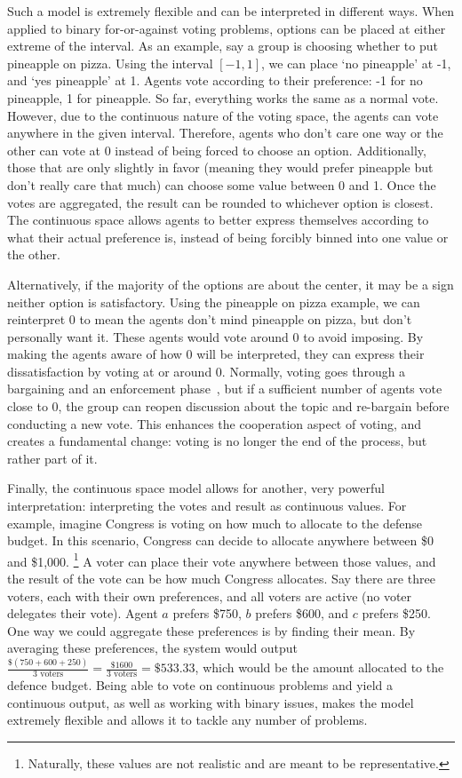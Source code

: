 Such a model is extremely flexible and can be interpreted in different ways.
When applied to binary for-or-against voting problems, options can be placed at either
extreme of the interval.
As an example, say a group is choosing whether to put pineapple on pizza.
Using the interval $[-1, 1]$, we can place `no pineapple' at -1, and `yes pineapple'
at 1.
Agents vote according to their preference: -1 for no pineapple, 1 for pineapple.
So far, everything works the same as a normal vote.
However, due to the continuous nature of the voting space, the agents can vote
anywhere in the given interval.
Therefore, agents who don't care one way or the other can vote at 0 instead of being
forced to choose an option.
Additionally, those that are only slightly in favor (meaning they would prefer
pineapple but don't really care that much) can choose some value between 0 and 1.
Once the votes are aggregated, the result can be rounded to whichever option is
closest.
The continuous space allows agents to better express themselves according to what
their actual preference is, instead of being forcibly binned into one value or the
other.

Alternatively, if the majority of the options are about the center, it may be a sign
neither option is satisfactory.
Using the pineapple on pizza example, we can reinterpret 0 to mean the agents don't
mind pineapple on pizza, but don't personally want it.
These agents would vote around 0 to avoid imposing.
By making the agents aware of how 0 will be interpreted, they can express their
dissatisfaction by voting at or around 0.
Normally, voting goes through a bargaining and an enforcement
phase~\cite{Fearon1998}, but if a sufficient number of agents vote close to 0, the
group can reopen discussion about the topic and re-bargain before conducting a new vote.
This enhances the cooperation aspect of voting, and creates a fundamental change:
voting is no longer the end of the process, but rather part of it.

Finally, the continuous space model allows for another, very powerful interpretation:
interpreting the votes and result as continuous values.
For example, imagine Congress is voting on how much to allocate to the defense budget.
In this scenario, Congress can decide to allocate anywhere between \$0 and \$1,000.
\footnote{
    Naturally, these values are not realistic and are meant to be representative.
}
A voter can place their vote anywhere between those values, and the result of the
vote can be how much Congress allocates.
Say there are three voters, each with their own preferences, and all voters are
active (no voter delegates their vote).
Agent $a$ prefers \$750, $b$ prefers \$600, and $c$ prefers \$250.
One way we could aggregate these preferences is by finding their mean.
By averaging these preferences, the system would output
$\frac{\$(750 + 600 + 250)}{3 \text{ voters}} = \frac{\$1600}{3 \text{ voters}} =
\$533.33$,
which would be the amount allocated to the defence budget.
Being able to vote on continuous problems and yield a continuous output, as well as
working with binary issues, makes the model extremely flexible and allows it to
tackle any number of problems.

